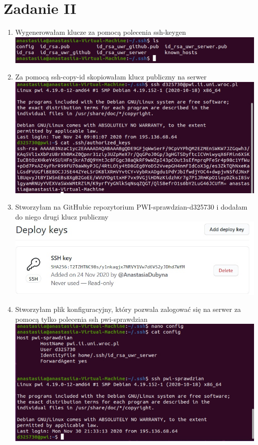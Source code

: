 \documentclass[12pt]{article}
\begin{document}
\section*{Zadanie II}
\begin{enumerate}
    \item Wygenerowałam klucze za pomocą polecenia ssh-keygen \\
    \includegraphics[scale = 0.8]{1.jpg}
    \item Za pomocą ssh-copy-id skopiowałam klucz publiczny na serwer \\
    \includegraphics[scale = 0.8]{2.jpg}
    \item Stworzyłam na GitHubie repozytorium PWI-sprawdzian-d325730 i dodałam do niego drugi klucz publiczny \\
    \includegraphics[scale = 0.8]{3.jpg}
    \newpage
    \item Stworzyłam plik konfiguracyjny, który pozwala zalogować się na serwer za pomocą tylko polecenia ssh pwi-sprawdzian\\
    \includegraphics[scale = 0.8]{4.jpg}

\end{enumerate}
\end{document}
